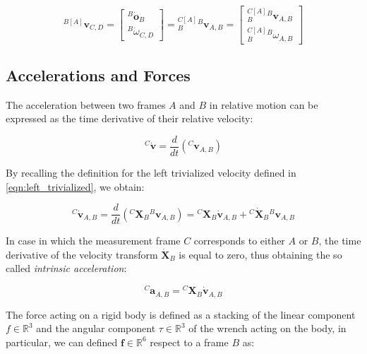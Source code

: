 \begin{equation}
    {}^{B[A]}\mathbf{v} _{C,D} =
    \begin{bmatrix}
        {}^B \dot{\mathbf{o}} _B \\
        {}^B \dot{\omega}_{C,D}
    \end{bmatrix} =
    {}^{C[A]}_B {}^B\mathbf{v}_{A,B} = \begin{bmatrix}
        {}^{C[A]}_B {}^B\mathbf{v}_{A,B} \\
        {}^{C[A]}_B {}^B\omega_{A,B}
    \end{bmatrix}
\end{equation}

\subsection{Accelerations and Forces}

The acceleration between two frames $A$ and $B$ in relative motion can be expressed as the time derivative of their relative velocity:

\begin{equation}
    {}^C\dot{\mathbf{v}} = \frac{d}{dt}\left( {}^C \mathbf{v}_{A,B}\right)
\end{equation}

By recalling the definition for the left trivialized velocity defined in \cref{eqn:left_trivialized}, we obtain:

\begin{equation}
    {}^C\dot{\mathbf{v}} _{A,B} = \frac{d}{dt} \left({}^C \mathbf{X}_B {}^B\mathbf{v}_{A,B} \right) = {}^C \mathbf{X}_B \dot{\mathbf{v}}_{A,B} + {}^C \dot{\mathbf{X}}_B {}^B\mathbf{v}_{A,B}
\end{equation}

In case in which the measurement frame $C$ corresponds to either $A$ or $B$, the time derivative of the velocity transform $\dot{\mathbf{X}}_B$ is equal to zero, thus obtaining the so called \textit{intrinsic acceleration}:

\begin{equation}
    {}^C\mathbf{a}_{A,B} = {}^C \mathbf{X}_B \dot{\mathbf{v}}_{A,B}
\end{equation}

The force acting on a rigid body is defined as a stacking of the linear component $f \in \mathbb{R}^3$ and the angular component $\tau \in \mathbb{R}^3$ of the wrench acting on the body, in particular, we can defined $\mathbf{f} \in \mathbb{R}^6$ respect to a frame $B$ as:

